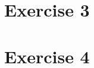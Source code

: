 \documentclass[11pt,a4paper]{article}
\begin{document}
\begin{titlepage}
    \maketitle
\end{titlepage}
\renewcommand{\contentsname}{Contents}
\begin{center} 
    \tableofcontents 
\end{center}
\newpage
\section{Exercise 3}


\section{Exercise 4}
\section{}


\end{document}
